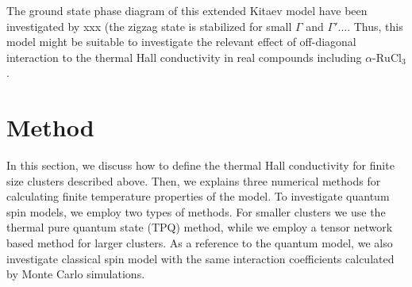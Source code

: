 \documentclass[reprint,amsmath,amssymb,aps,prx]{revtex4-2}
\begin{document}
The ground state phase diagram of this extended Kitaev model have been investigated by xxx (the zigzag state is stabilized for small $\Gamma$ and $\Gamma'$.... Thus, this model might be suitable to investigate the relevant effect of off-diagonal interaction to the thermal Hall conductivity in real compounds including $\alpha$-$\mathrm{RuCl_3}$.


\section{Method}
In this section, we discuss how to define the thermal Hall conductivity for finite size clusters described above. Then, we explains three numerical methods for calculating finite temperature properties of the model. To investigate quantum spin models, we employ two types of methods. For smaller clusters we use the thermal pure quantum state (TPQ) method, while we employ a tensor network based method for larger clusters. As a reference to the quantum model, we also investigate classical spin model with the same interaction coefficients calculated by Monte Carlo simulations.
\end{document}
